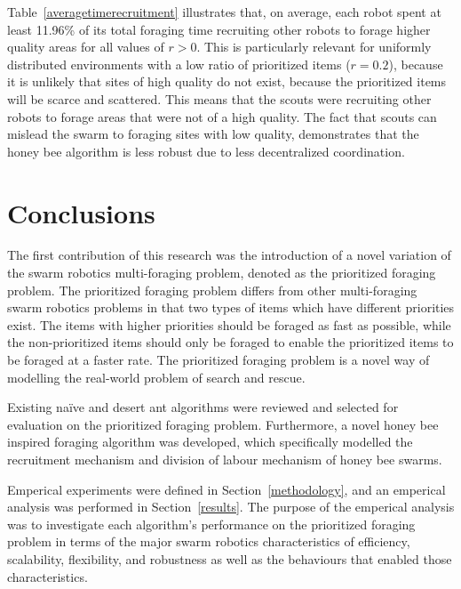 \documentclass[preprint,12pt]{elsarticle}
\begin{document}
Table~\ref{averagetimerecruitment} illustrates that, on average, each robot spent at least 11.96\% of its total foraging time recruiting other robots to forage higher quality areas for all values of $r > 0$. This is particularly relevant for uniformly distributed environments with a low ratio of prioritized items ($r = 0.2$), because it is unlikely that sites of high quality do not exist, because the prioritized items will be scarce and scattered. This means that the scouts were recruiting other robots to forage areas that were not of a high quality. The fact that scouts can mislead the swarm to foraging sites with low quality, demonstrates that the honey bee algorithm is less robust due to less decentralized coordination.



\section{Conclusions}
\label{Conclusions}

The first contribution of this research was the introduction of a novel variation of the swarm robotics multi-foraging problem, denoted as the prioritized foraging problem. The prioritized foraging problem differs from other multi-foraging swarm robotics problems in that two types of items which have different priorities exist. The items with higher priorities should be foraged as fast as possible, while the non-prioritized items should only be foraged to enable the prioritized items to be foraged at a faster rate. The prioritized foraging problem is a novel way of modelling the real-world problem of search and rescue.  

Existing na\"ive and desert ant algorithms were reviewed and selected for evaluation on the prioritized foraging problem. Furthermore, a novel honey bee inspired foraging algorithm was developed, which specifically modelled the recruitment mechanism and division of labour mechanism of honey bee swarms.

Emperical experiments were defined in Section~\ref{methodology}, and an emperical analysis was performed in Section~\ref{results}. The purpose of the emperical analysis was to investigate each algorithm's performance on the prioritized foraging problem in terms of the major swarm robotics characteristics of efficiency, scalability, flexibility, and robustness as well as the behaviours that enabled those characteristics. 
\end{document}
